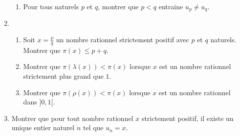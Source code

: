 \begin{enumerate}
\begin{enumerate}
 \item Pour tous naturels $p$ et $q$, montrer que $p<q$ entraine $u_p\neq u_q$.
\end{enumerate}
\item
\begin{enumerate}
 \item Soit $x=\frac{p}{q}$ un nombre rationnel strictement positif avec $p$ et $q$ naturels. Montrer que $\pi(x)\leq p+q$.
 \item Montrer que $\pi(\lambda(x)) < \pi(x)$ lorsque $x$ est un nombre rationnel strictement plus grand que $1$.
 \item Montrer que $\pi(\rho(x))<\pi(x)$ lorsque $x$ est un nombre rationnel dans $]0,1[$.
\end{enumerate}
\item Montrer que pour tout nombre rationnel $x$ strictement positif, il existe un unique entier naturel $n$ tel que $u_n=x$. 
\end{enumerate}

